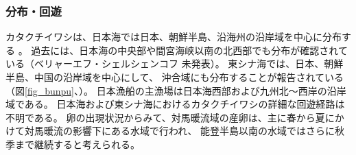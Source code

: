 \subsubsection{分布・回遊}
カタクチイワシは、日本海では日本、朝鮮半島、沿海州の沿岸域を中心に分布する
\citep{Ochiai1986}。
過去には、日本海の中央部や間宮海峡以南の北西部でも分布が確認されている（ベリャーエフ・シェルシェンコフ 未発表）。
東シナ海では、日本、朝鮮半島、中国の沿岸域を中心にして、
沖合域にも分布することが報告されている
（図\ref{fig_bunpu}、\citet{Iversen1993, Ohshimo1996}）。
日本漁船の主漁場は日本海西部および九州北～西岸の沿岸域である。
日本海および東シナ海におけるカタクチイワシの詳細な回遊経路は不明である。
卵の出現状況からみて、対馬暖流域の産卵は、主に春から夏にかけて対馬暖流の影響下にある水域で行われ、
能登半島以南の水域ではさらに秋季まで継続すると考えられる\citep{Uchida1958}。
